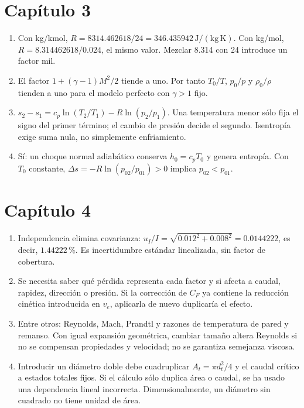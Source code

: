 \section*{Capítulo 3}
\begin{enumerate}
\item Con kg/kmol, $R=8314.462618/24=346.435942\,\mathrm{J/(kg\,K)}$. Con kg/mol, $R=8.314462618/0.024$, el mismo valor. Mezclar 8.314 con 24 introduce un factor mil.
\item El factor $1+(\gamma-1)M^2/2$ tiende a uno. Por tanto $T_0/T$, $p_0/p$ y $\rho_0/\rho$ tienden a uno para el modelo perfecto con $\gamma>1$ fijo.
\item $s_2-s_1=c_p\ln(T_2/T_1)-R\ln(p_2/p_1)$. Una temperatura menor sólo fija el signo del primer término; el cambio de presión decide el segundo. Isentropía exige suma nula, no simplemente enfriamiento.
\item Sí: un choque normal adiabático conserva $h_0=c_pT_0$ y genera entropía. Con $T_0$ constante, $\Delta s=-R\ln(p_{02}/p_{01})>0$ implica $p_{02}<p_{01}$.
\end{enumerate}
\section*{Capítulo 4}
\begin{enumerate}
\item Independencia elimina covarianza: $u_I/I=\sqrt{0.012^2+0.008^2}=0.0144222$, es decir, $1.44222\,\%$. Es incertidumbre estándar linealizada, sin factor de cobertura.
\item Se necesita saber qué pérdida representa cada factor y si afecta a caudal, rapidez, dirección o presión. Si la corrección de $C_F$ ya contiene la reducción cinética introducida en $v_e$, aplicarla de nuevo duplicaría el efecto.
\item Entre otros: Reynolds, Mach, Prandtl y razones de temperatura de pared y remanso. Con igual expansión geométrica, cambiar tamaño altera Reynolds si no se compensan propiedades y velocidad; no se garantiza semejanza viscosa.
\item Introducir un diámetro doble debe cuadruplicar $A_t=\pi d_t^2/4$ y el caudal crítico a estados totales fijos. Si el cálculo sólo duplica área o caudal, se ha usado una dependencia lineal incorrecta. Dimensionalmente, un diámetro sin cuadrado no tiene unidad de área.
\end{enumerate}
